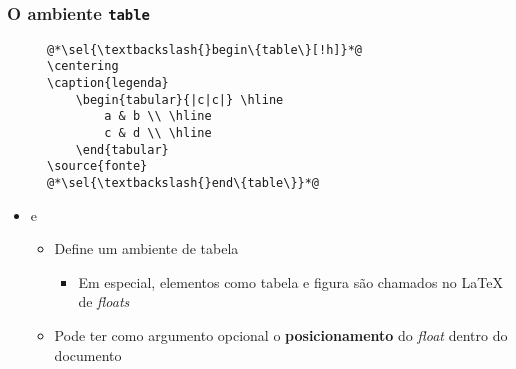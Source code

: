 \begin{frame}[fragile] \frametitle{O ambiente \texttt{table}}
\vspace{-0.5cm}
\begin{figure}[!t]
\begin{lstlisting}
@*\sel{\textbackslash{}begin\{table\}[!h]}*@
\centering
\caption{legenda}
	\begin{tabular}{|c|c|} \hline
		a & b \\ \hline
		c & d \\ \hline
	\end{tabular}
\source{fonte}
@*\sel{\textbackslash{}end\{table\}}*@
\end{lstlisting}
\end{figure}

\begin{itemize}
	\item {} e 
	\begin{itemize}
		\item Define um ambiente de tabela
		\begin{itemize}
			\item Em especial, elementos como tabela e figura são chamados no LaTeX de \textit{floats}
		\end{itemize}
		\item Pode ter como argumento opcional o \textbf{posicionamento} do \textit{float} dentro do documento
	\end{itemize}
\end{itemize}
\end{frame}

